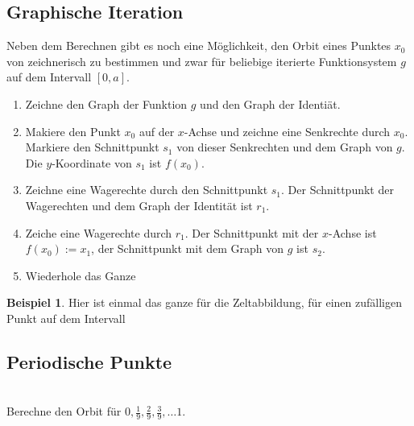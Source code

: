 \documentclass[a4paper,ngerman,12pt]{zirkelblatt1415}
\theoremstyle{definition}
\newtheorem{beispiel}[definition]{Beispiel}
\theoremstyle{remark}
\begin{document}
\subsection{Graphische Iteration}
Neben dem Berechnen gibt es noch eine Möglichkeit, den Orbit eines Punktes $x_0$ von zeichnerisch zu bestimmen und zwar für beliebige iterierte Funktionsystem $g$ auf dem Intervall $[0,a]$.
\begin{enumerate}
\item Zeichne den Graph der Funktion $g$ und den Graph der Identiät.
\begin{figure}

\end{figure}
\item Makiere den Punkt $x_0$ auf der $x$-Achse und zeichne eine Senkrechte durch $x_0$. Markiere den Schnittpunkt $s_1$ von dieser Senkrechten und dem Graph von $g$. Die $y$-Koordinate von $s_1$ ist $f\left(x_0\right)$.
\begin{figure}

\end{figure}
\item Zeichne eine Wagerechte durch den Schnittpunkt $s_1$. Der Schnittpunkt der Wagerechten und dem Graph der Identität ist $r_1$.
\begin{figure}

\end{figure} 
\item Zeiche eine Wagerechte durch $r_1$. Der Schnittpunkt mit der $x$-Achse ist $f\left(x_0\right):=x_1$, der Schnittpunkt mit dem Graph von $g$ ist $s_2$.
\begin{figure}

\end{figure}
\item Wiederhole das Ganze
\end{enumerate}

\begin{beispiel}
Hier ist einmal das ganze für die Zeltabbildung, für einen zufälligen Punkt auf dem Intervall
\begin{figure}

\end{figure}
\end{beispiel}


\subsection{Periodische Punkte}
\begin{aufgabe}\\
Berechne den Orbit für $0, \frac{1}{9}, \frac{2}{9}, \frac{3}{9}, \ldots 1$. 
\end{aufgabe}
\end{document}
